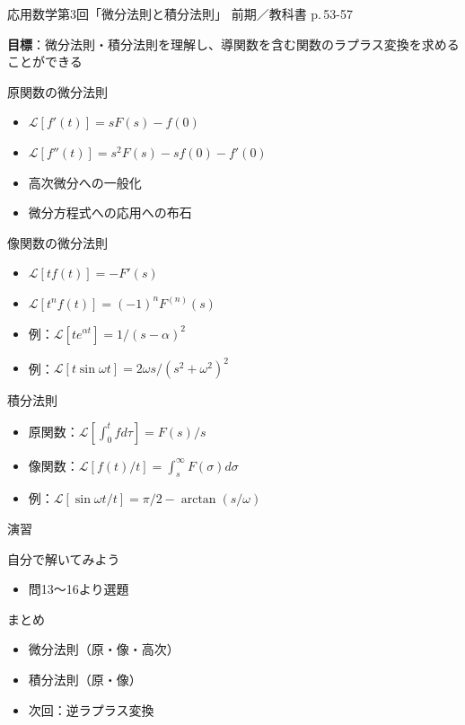 \documentclass[aspectratio=43,professionalfonts,handout]{beamer}
\newcommand{\LectureNum}{3}
\newcommand{\LectureTitle}{微分法則と積分法則}
\newcommand{\TextPages}{p.\,53-57}
\newcommand{\CourseName}{応用数学}
\renewcommand{\TermName}{前期}
\begin{document}
\begin{frame}{\CourseName\quad 第\LectureNum 回「\LectureTitle」}
  {\small \TermName\quad \TeacherName\quad ／\quad 教科書 \TextPages}

  \textbf{目標}：微分法則・積分法則を理解し、導関数を含む関数のラプラス変換を求めることができる

\end{frame}

\begin{frame}{原関数の微分法則}
  \begin{block}{}
  \begin{itemize}
    \item $\mathcal{L}[f'(t)] = sF(s) - f(0)$
    \item $\mathcal{L}[f''(t)] = s^{2}F(s) - sf(0) - f'(0)$
    \item 高次微分への一般化
    \item 微分方程式への応用への布石
  \end{itemize}
  \end{block}
\end{frame}

\begin{frame}{像関数の微分法則}
  \begin{block}{}
  \begin{itemize}
    \item $\mathcal{L}[tf(t)] = -F'(s)$
    \item $\mathcal{L}[t^n f(t)] = (-1)^n F^{(n)}(s)$
    \item 例：$\mathcal{L}[te^{\alpha t}] = 1/(s-\alpha)^{2}$
    \item 例：$\mathcal{L}[t \sin \omega t] = 2\omega s/(s^{2}+\omega^{2})^{2}$
  \end{itemize}
  \end{block}
\end{frame}

\begin{frame}{積分法則}
  \begin{block}{}
  \begin{itemize}
    \item 原関数：$\mathcal{L}[\int_0^t f d\tau] = F(s)/s$
    \item 像関数：$\mathcal{L}[f(t)/t] = \int_s^\infty F(\sigma)d\sigma$
    \item 例：$\mathcal{L}[\sin \omega t / t] = \pi/2 - \arctan(s/\omega)$
  \end{itemize}
  \end{block}
\end{frame}

\begin{frame}{演習}
  \begin{exampleblock}{自分で解いてみよう}
  \begin{itemize}
    \item 問13〜16より選題
  \end{itemize}
  \end{exampleblock}
\end{frame}

\begin{frame}{まとめ}
  \begin{itemize}
    \item 微分法則（原・像・高次）
    \item 積分法則（原・像）
    \item 次回：逆ラプラス変換
  \end{itemize}
\end{frame}
\end{document}
